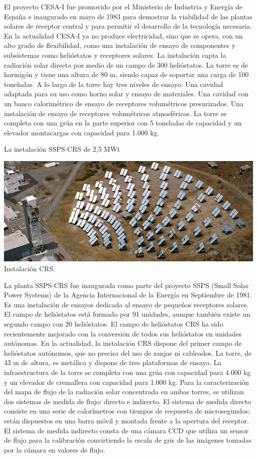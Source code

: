 \documentclass[12pt]{article}
\begin{document}
El proyecto CESA-I fue promovido por el Ministerio de Industria y Energía de España e inaugurado en mayo de 1983 para demostrar la viabilidad de las plantas solares de receptor central y para permitir el desarrollo de la tecnología necesaria. En la actualidad CESA-I ya no produce electricidad, sino que se opera, con un alto grado de flexibilidad, como una instalación de ensayo de componentes y subsistemas como helióstatos y receptores solares.
La instalación capta la radiación solar directa por medio de un campo de 300 helióstatos.
La torre es de hormigón y tiene una altura de 80 m, siendo capaz de soportar una carga de 100 toneladas. A lo largo de la torre hay tres niveles de ensayo:
Una cavidad adaptada para su uso como horno solar y ensayo de materiales.
Una cavidad con un banco calorimétrico de ensayo de receptores volumétricos presurizados.
Una instalación de ensayo de receptores volumétricos atmosféricos.
La torre se completa con una grúa en la parte superior con 5 toneladas de capacidad y un elevador montacargas con capacidad para 1.000 kg. \cite{PSA3WebSite}



La instalación SSPS-CRS de 2,5 MWt

\includegraphics[width=\textwidth]{unnamed (6).png}
Instalación CRS. \cite{PSA2WebSite}

La planta SSPS-CRS fue inaugurada como parte del proyecto SSPS (Small Solar Power Systems) de la Agencia Internacional de la Energía en Septiembre de 1981.
Es una instalación de ensayos dedicada al ensayo de pequeños receptores solares. El campo de helióstatos está formado por 91 unidades, aunque también existe un segundo campo con 20 helióstatos.
El campo de helióstatos CRS ha sido recientemente mejorado con la conversión de todos sus helióstatos en unidades autónomas. En la actualidad, la instalación CRS dispone del primer campo de helióstatos autónomos, que no precisa del uso de zanjas ni cableados.
La torre, de 43 m de altura, es metálica y dispone de tres plataformas de ensayo.
La infraestructura de la torre se completa con una grúa con capacidad para 4.000 kg y un elevador de cremallera con capacidad para 1.000 kg.
Para la caracterización del mapa de flujo de la radiación solar concentrada en ambas torres, se utilizan dos sistemas de medida de flujo: directo e indirecto. El sistema de medida directo consiste en una serie de calorímetros con tiempos de respuesta de microsegundos; están dispuestos en una barra móvil y montada frente a la apertura del receptor. El sistema de medida indirecto consta de una cámara CCD que utiliza un sensor de flujo para la calibración convirtiendo la escala de gris de las imágenes tomadas por la cámara en valores de flujo. \cite{PSA4WebSite}
\end{document}
